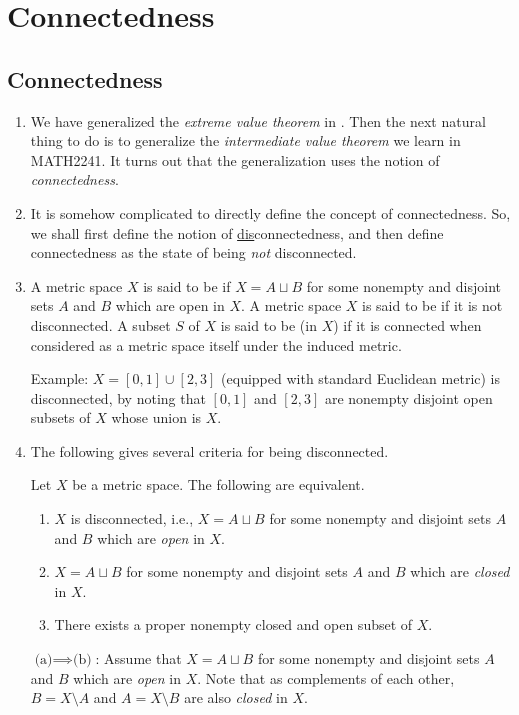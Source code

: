 \section{Connectedness}
\label{sect:connectedness}
\subsection{Connectedness}
\begin{enumerate}
\item We have generalized the \emph{extreme value theorem} in
. Then the next natural thing to do is to generalize the
\emph{intermediate value theorem} we learn in MATH2241. It turns out that the
generalization uses the notion of \emph{connectedness}.

\item It is somehow complicated to directly define the concept of
connectedness. So, we shall first define the notion of
\underline{dis}connectedness, and then define connectedness as the state of
being \emph{not} disconnected.

\item A metric space \(X\) is said to be  if \(X=A\sqcup B\)
for some nonempty and disjoint sets \(A\) and \(B\) which are open in \(X\).  A
metric space \(X\) is said to be  if it is not disconnected. A
subset \(S\) of \(X\) is said to be  (in \(X\)) if it is
connected when considered as a metric space itself under the induced metric.

Example: \(X=[0,1]\cup [2,3]\) (equipped with standard Euclidean metric) is
disconnected, by noting that \([0,1]\) and \([2,3]\) are nonempty disjoint open
subsets of \(X\) whose union is \(X\).

\item The following gives several criteria for being disconnected.

\begin{proposition}
\label{prp:discon-crit}
Let \(X\) be a metric space. The following are equivalent.
\begin{enumerate}
\item \(X\) is disconnected, i.e., \(X=A\sqcup B\) for some nonempty and
disjoint sets \(A\) and \(B\) which are \emph{open} in \(X\).
\item \(X=A\sqcup B\) for some nonempty and
disjoint sets \(A\) and \(B\) which are \emph{closed} in \(X\).
\item There exists a proper nonempty closed and open subset of \(X\).
\end{enumerate}
\end{proposition}
\begin{pf}
\underline{\(\text{(a)}\implies \text{(b)}\)}: Assume that \(X=A\sqcup B\) for some nonempty and
disjoint sets \(A\) and \(B\) which are \emph{open} in \(X\). Note that as
complements of each other, \(B=X\setminus A\) and \(A=X\setminus B\) are also
\emph{closed} in \(X\).


\end{pf}
\end{enumerate}
